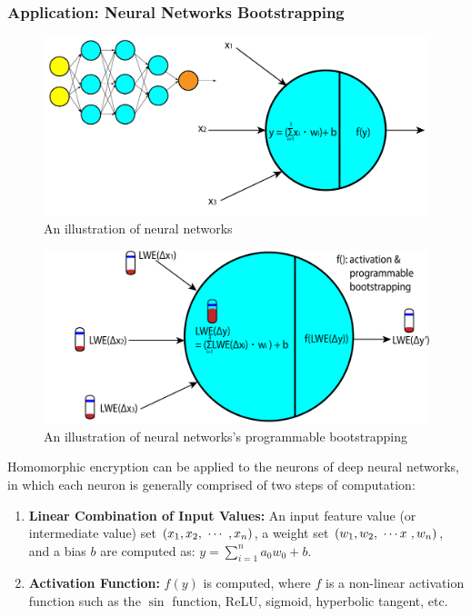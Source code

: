 \subsubsection{Application: Neural Networks Bootstrapping}
\label{subsec:tfhe-neural-network}

\begin{figure}[h!]
    \centering
  \includegraphics[width=0.8\linewidth]{figures/neural-network.pdf}
  \caption{An illustration of neural networks }
  \label{fig:neural-network}
\end{figure}

\begin{figure}[h!]
    \centering
  \includegraphics[width=0.8\linewidth]{figures/nn-homomorphic.pdf}
  \caption{An illustration of neural networks's programmable bootstrapping}
  \label{fig:neural-network2}
\end{figure}

Homomorphic encryption can be applied to the neurons of deep neural networks, in which each neuron is generally comprised of two steps of computation: 

\begin{enumerate}
\item \textbf{Linear Combination of Input Values:} An input feature value (or intermediate value) set $(x_1, x_2, \text{ } \text{$\cdots$} \text{ }, x_n)$, a weight set $(w_1, w_2, \text{ } \text{$\cdots x$} \text{ }, w_n)$, and a bias $b$ are computed as: $y = \sum\limits_{i=1}^{n}a_0w_0 + b$. 
\item \textbf{Activation Function:} $f(y)$ is computed, where $f$ is a non-linear activation function such as the $\sin$ function, ReLU, sigmoid, hyperbolic tangent, etc. 
\end{enumerate}

